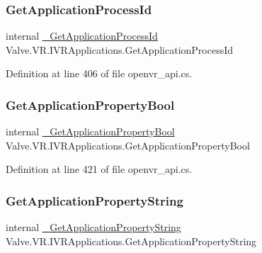 \subsubsection{\texorpdfstring{GetApplicationProcessId}{GetApplicationProcessId}}
{\footnotesize\ttfamily internal \mbox{\hyperlink{struct_valve_1_1_v_r_1_1_i_v_r_applications_a1ee4e4ced406991223199be10cee99af}{\+\_\+\+Get\+Application\+Process\+Id}} Valve.\+V\+R.\+I\+V\+R\+Applications.\+Get\+Application\+Process\+Id}



Definition at line 406 of file openvr\+\_\+api.\+cs.

\mbox{\label{struct_valve_1_1_v_r_1_1_i_v_r_applications_a44ba301b27c76a75708cd14e9f98c83c}} 
\subsubsection{\texorpdfstring{GetApplicationPropertyBool}{GetApplicationPropertyBool}}
{\footnotesize\ttfamily internal \mbox{\hyperlink{struct_valve_1_1_v_r_1_1_i_v_r_applications_ae970669423f2d1c534e4268eb4421841}{\+\_\+\+Get\+Application\+Property\+Bool}} Valve.\+V\+R.\+I\+V\+R\+Applications.\+Get\+Application\+Property\+Bool}



Definition at line 421 of file openvr\+\_\+api.\+cs.

\mbox{\label{struct_valve_1_1_v_r_1_1_i_v_r_applications_ab230508fb654fcdb64ab56fdc133dd91}} 
\subsubsection{\texorpdfstring{GetApplicationPropertyString}{GetApplicationPropertyString}}
{\footnotesize\ttfamily internal \mbox{\hyperlink{struct_valve_1_1_v_r_1_1_i_v_r_applications_a29be5eea80ac523877cbc8596f8b6f34}{\+\_\+\+Get\+Application\+Property\+String}} Valve.\+V\+R.\+I\+V\+R\+Applications.\+Get\+Application\+Property\+String}



